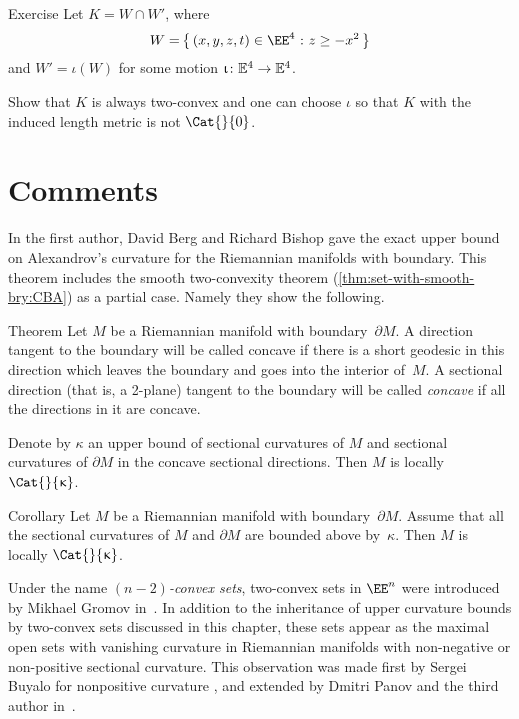 \begin{thm}{Exercise}\label{ex:two-convex-not-a-CAT}
Let $K=W\cap W'$, where 
\[W=\set{(x,y,z,t)\in \EE^4}{z\ge -x^2}\]
and $W'=\iota(W)$ for some motion $\iota\:\EE^4\to\EE^4$.

Show that $K$ is always two-convex and one can choose $\iota$ so that $K$  with the induced length metric is not $\Cat{}{0}$.
\end{thm}









\section{Comments}

In \cite{a-b-b:CBA-m-w-b} the first author, David Berg and Richard Bishop gave the exact upper bound on Alexandrov's curvature for the Riemannian manifolds with boundary.
This theorem includes the smooth two-convexity theorem (\ref{thm:set-with-smooth-bry:CBA}) as a partial case.
Namely they show the following.

\begin{thm}{Theorem}
Let $M$ be a Riemannian manifold with boundary~$\partial M$.
A direction tangent to the boundary will be called concave if there is a short geodesic in this direction which leaves the boundary and goes into the interior of~$M$.
A sectional direction (that is, a 2-plane) 
tangent to the boundary 
will be called \emph{concave} if all the directions in it are concave.

Denote by $\kappa$ an upper bound of sectional curvatures of $M$ and  
sectional curvatures of $\partial M$ in the concave sectional directions. 
Then $M$ is locally $\Cat{}{\kappa}$. 
\end{thm}

\begin{thm}{Corollary}
Let $M$ be a Riemannian manifold with boundary~$\partial M$. 
Assume that all the sectional curvatures of $M$ and $\partial M$ are bounded above by~$\kappa$.
Then $M$ is locally $\Cat{}{\kappa}$.
\end{thm}

Under the name \emph{$(n-2)$-convex sets}, 
two-convex sets in $\EE^n$ were introduced by Mikhael Gromov in~\cite{gromov:SaGMC}.
In addition to the inheritance of upper curvature bounds by two-convex sets discussed in this chapter, 
these sets appear as the maximal open sets with vanishing curvature in  Riemannian manifolds with non-negative or non-positive sectional curvature.
This observation was made first by Sergei Buyalo for nonpositive curvature \cite[Lemma 5.8]{buyalo}, 
and extended by Dmitri Panov and the third author in~\cite{panov-petrunin:sweeping}.

